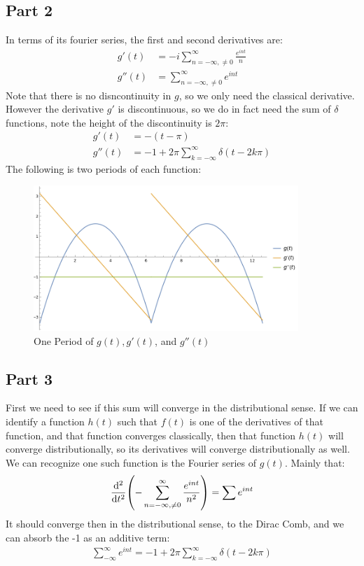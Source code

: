 \documentclass[12pt]{article}
\begin{document}
\subsection*{Part 2}
In terms of its fourier series, the first and second derivatives are:
\begin{equation}
  \boxed{
    \begin{aligned}
      g'(t)&=-i\sum_{n=-\infty,\neq0}^\infty\frac{e^{int}}{n}\\
      g''(t)&=\sum_{n=-\infty,\neq0}^\infty e^{int}
    \end{aligned}
  }
\end{equation}
Note that there is no disncontinuity in $g$, so we only need the classical derivative. However the derivative $g'$ is discontinuous, so we do in fact need the sum of $\delta$ functions, note the height of the discontinuity is $2\pi$:
\begin{equation}
  \boxed{
    \begin{aligned}
      g'(t)&=-(t-\pi)\\
      g''(t)&=-1+2\pi\sum_{k=-\infty}^\infty\delta(t-2k\pi)
    \end{aligned}
  }
\end{equation}
The following is two periods of each function:
\begin{figure}[H]
  \centering
  \includegraphics[width=10cm]{fourierplot.png}
  \caption{One Period of $g(t), g'(t)$, and $g''(t)$}
  \label{fig:1}
\end{figure}
\subsection*{Part 3}
First we need to see if this sum will converge in the distributional sense. If we can identify a function $h(t)$ such that $f(t)$ is one of the derivatives of that function, and that function converges classically, then that function $h(t)$ will converge distributionally, so its derivatives will converge distributionally as well. We can recognize one such function is the Fourier series of $g(t)$. Mainly that:
\begin{align*}
  \dv[2]{t}\qty(-\sum_{n=-\infty,\neq0}^\infty\frac{e^{int}}{n^2})=\sum e^{int}
\end{align*}
It should converge then in the distributional sense, to the Dirac Comb, and we can absorb the -1 as an additive term:
\begin{align}
  \boxed{
    \sum_{-\infty}^\infty e^{int}=-1+2\pi\sum_{k=-\infty}^{\infty}\delta(t-2k\pi)
  }
\end{align}
\newpage
\end{document}
